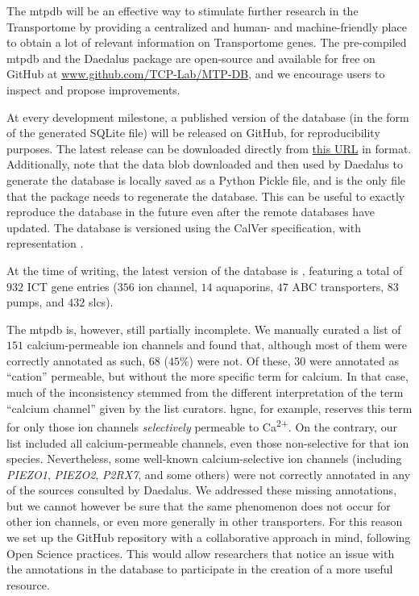 The \gls{mtpdb} will be an effective way to stimulate further research in the Transportome by providing a centralized and human- and machine-friendly place to obtain a lot of relevant information on Transportome genes.
The pre-compiled \gls{mtpdb} and the Daedalus package are open-source and available for free on GitHub at \href{https://github.com/TCP-Lab/MTP-DB/}{www.github.com/TCP-Lab/MTP-DB}, and we encourage users to inspect and propose improvements.

At every development milestone, a published version of the database (in the form of the generated SQLite file) will be released on GitHub, for reproducibility purposes.
The latest release can be downloaded directly from \href{https://github.com/TCP-Lab/MTP-DB/releases/latest/download/MTPDB.sqlite.gz}{this URL} in  format.
Additionally, note that the data blob downloaded and then used by Daedalus to generate the database is locally saved as a Python Pickle file, and is the only file that the package needs to regenerate the database.
This can be useful to exactly reproduce the database in the future even after the remote databases have updated.
The database is versioned using the CalVer specification, with representation .

At the time of writing, the latest version of the database is , featuring a total of $932$ ICT gene entries ($356$ ion channel, $14$ aquaporins, $47$ ABC transporters, $83$ pumps, and $432$ \glspl{slc}).

The \gls{mtpdb} is, however, still partially incomplete.
We manually curated a list of $151$ calcium-permeable ion channels and found that, although most of them were correctly annotated as such, $68$ ($45\%$) were not.
Of these, $30$ were annotated as ``cation'' permeable, but without the more specific term for calcium.
In that case, much of the inconsistency stemmed from the different interpretation of the term ``calcium channel'' given by the list curators.
\gls{hgnc}, for example, reserves this term for only those ion channels \textit{selectively} permeable to Ca\textsuperscript{2+}.
On the contrary, our list included all calcium-permeable channels, even those non-selective for that ion species.
Nevertheless, some well-known calcium-selective ion channels (including \textit{PIEZO1}, \textit{PIEZO2}, \textit{P2RX7}, and some others) were not correctly annotated in any of the sources consulted by Daedalus.
We addressed these missing annotations, but we cannot however be sure that the same phenomenon does not occur for other ion channels, or even more generally  in other transporters.
For this reason we set up the GitHub repository with a collaborative approach
in mind, following Open Science practices.
This would allow researchers that notice an issue with the annotations in the database to participate in the creation of a more useful resource.

